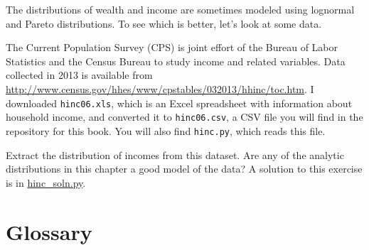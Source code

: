\documentclass[12pt]{book}
\begin{document}
\begin{exercise}
\label{income}

The distributions of wealth and income are sometimes modeled using
lognormal and Pareto distributions.  To see which is better, let's
look at some data.

The Current Population Survey (CPS) is joint effort of the Bureau
of Labor Statistics and the Census Bureau to study income and related
variables.  Data collected in 2013 is available from
\url{http://www.census.gov/hhes/www/cpstables/032013/hhinc/toc.htm}.
I downloaded {\tt hinc06.xls}, which is an Excel spreadsheet with
information about household income, and converted it to {\tt hinc06.csv},
a CSV file you will find in the repository for this book.  You
will also find {\tt hinc.py}, which reads this file.

Extract the distribution of incomes from this dataset.  Are any of the
analytic distributions in this chapter a good model of the data?  A
solution to this exercise is in \url{hinc_soln.py}.

\end{exercise}




\section{Glossary}
\end{document}
